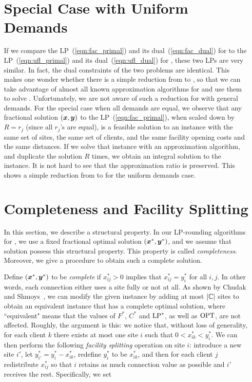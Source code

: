 \documentclass[oneside,final]{ucr}
\begin{document}

\section{Special Case with Uniform Demands}
\label{sec:ftfp_uniform_demand}

If we compare the LP~(\ref{eqn:fac_primal}) and its
dual~(\ref{eqn:fac_dual}) for {\FTFP} to the
LP~(\ref{eqn:ufl_primal}) and its dual~(\ref{eqn:ufl_dual})
for {\UFL}, these two LPs are very similar. In fact, the
dual constraints of the two problems are identical. This
makes one wonder whether there is a simple reduction from
{\FTFP} to {\UFL}, so that we can take advantage of almost
all known approximation algorithms for {\UFL} and use them
to solve {\FTFP}. Unfortunately, we are not aware of such a
reduction for {\FTFP} with general demands. For the special
case when all demands are equal, we observe that any
fractional solution $(\boldsymbol{x},\boldsymbol{y})$ to the
LP~(\ref{eqn:fac_primal}), when scaled down by $R = r_j$
(since all $r_j$'s are equal), is a feasible solution to an
{\UFL} instance with the same set of sites, the same set of
clients, and the same facility opening costs and the same
distances. If we solve that {\UFL} instance with an
approximation algorithm, and duplicate the solution $R$
times, we obtain an integral solution to the {\FTFP}
instance. It is not hard to see that the approximation ratio
is preserved. This shows a simple reduction from {\FTFP} to
{\UFL} for the uniform demands case.

\section{Completeness and Facility Splitting}
\label{sec:ftfp_complete}
In this section, we describe a structural property. In our
LP-rounding algorithms for {\FTFP}, we use a fixed
fractional optimal solution $(\boldsymbol{x}^\ast, \boldsymbol{y}^\ast)$, and we
assume that solution possess this structural property. This
property is called \emph{completeness}. Moreover, we give a
procedure to obtain such a complete solution.

Define $(\boldsymbol{x}^\ast, \boldsymbol{y}^\ast)$ to be \emph{complete} if
$x_{ij}^\ast>0$ implies that $x_{ij}^\ast=y_i^\ast$ for all
$i,j$. In other words, each connection either uses a site
fully or not at all.  As shown by Chudak and
Shmoys~\cite{ChudakS04}, we can modify the given instance by
adding at most $|\mathbb{C}|$ sites to obtain an equivalent
instance that has a complete optimal solution, where
``equivalent" means that the values of $F^\ast$, $C^\ast$
and $\mbox{\rm LP}^\ast$, as well as $\mbox{\rm OPT}$, are not
affected. Roughly, the argument is this: we notice that,
without loss of generality, for each client $k$ there exists
at most one site $i$ such that $0 < x_{ik}^\ast < y_i^\ast$.
We can then perform the following \emph{facility splitting}
operation on site $i$: introduce a new site $i'$, let
$y^\ast_{i'} = y^\ast_i - x^\ast_{ik}$, redefine $y^\ast_i$
to be $x^\ast_{ik}$, and then for each client $j$
redistribute $x^\ast_{ij}$ so that $i$ retains as much
connection value as possible and $i'$ receives the
rest. Specifically, we set
\end{document}
